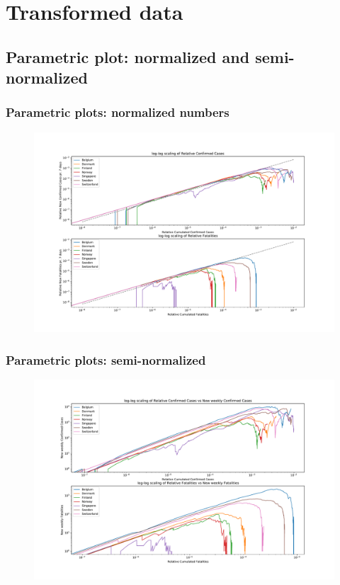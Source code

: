 \documentclass{beamer}
\begin{document}
\section{Transformed data}
\subsection{Parametric plot: normalized and semi-normalized}
\begin{frame}
\frametitle{Parametric plots: normalized numbers}
\begin{figure}[H]
\includegraphics[width=\textwidth]{../figs/parametric_plots_normalized_log.pdf}
\end{figure}
\end{frame}

\begin{frame}
\frametitle{Parametric plots: semi-normalized}
\begin{figure}[H]
\includegraphics[width=\textwidth]{../figs/parametric_plots_semi-normalized_log.pdf}
\end{figure}
\end{frame}
\end{document}
